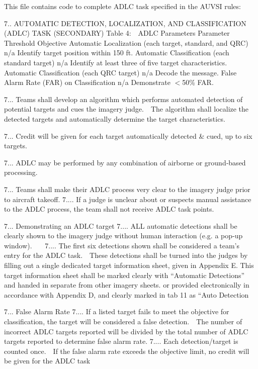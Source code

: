 This file contains code to complete A\-D\-L\-C task specified in the A\-U\-V\-S\-I rules\-:

7.. A\-U\-T\-O\-M\-A\-T\-I\-C D\-E\-T\-E\-C\-T\-I\-O\-N, L\-O\-C\-A\-L\-I\-Z\-A\-T\-I\-O\-N, A\-N\-D C\-L\-A\-S\-S\-I\-F\-I\-C\-A\-T\-I\-O\-N (A\-D\-L\-C) T\-A\-S\-K (S\-E\-C\-O\-N\-D\-A\-R\-Y) Table 4\-:  \-A\-D\-L\-C Parameters Parameter Threshold Objective Automatic Localization (each target, standard, and Q\-R\-C) n/a Identify target position within 150 ft. Automatic Classification (each standard target) n/a Identify at least three of five target characteristics. Automatic Classification (each Q\-R\-C target) n/a Decode the message. False Alarm Rate (F\-A\-R) on Classification n/a Demonstrate $<$50\% F\-A\-R.

7... Teams shall develop an algorithm which performs automated detection of potential targets and cues the imagery judge.\-  \-The algorithm shall localize the detected targets and automatically determine the target characteristics.

7... Credit will be given for each target automatically detected \& cued, up to six targets.

7... A\-D\-L\-C may be performed by any combination of airborne or ground‐based processing.

7... Teams shall make their A\-D\-L\-C process very clear to the imagery judge prior to aircraft takeoff. 7.... If a judge is unclear about or suspects manual assistance to the A\-D\-L\-C process, the team shall not receive A\-D\-L\-C task points.

7... Demonstrating an A\-D\-L\-C target 7.... A\-L\-L automatic detections shall be clearly shown to the imagery judge without human interaction (e.\-g. a pop‐up window).    7.... The first six detections shown shall be considered a team’s entry for the A\-D\-L\-C task.\-  \-These detections shall be turned into the judges by filling out a single dedicated target information sheet, given in Appendix E. This target information sheet shall be marked clearly with “\-Automatic Detections” and handed in separate from other imagery sheets. or provided electronically in accordance with Appendix D, and clearly marked in tab 11 as “\-Auto Detection

7... False Alarm Rate 7.... If a listed target fails to meet the objective for classification, the target will be considered a false detection.\-  \-The number of incorrect A\-D\-L\-C targets reported will be divided by the total number of A\-D\-L\-C targets reported to determine false alarm rate. 7.... Each detection/target is counted once.\-  \-If the false alarm rate exceeds the objective limit, no credit will be given for the A\-D\-L\-C task 
